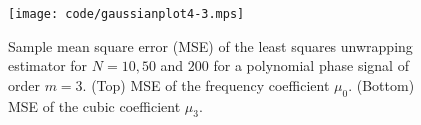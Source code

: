 \documentclass[aap,preprint]{imsart}
\begin{document}
\begin{figure}[p] 
   	\centering 
  		\texttt{[image: code/gaussianplot4-3.mps]}
  		\caption{Sample mean square error (MSE) of the least squares unwrapping estimator for $N=10,50$ and $200$ for a polynomial phase signal of order $m=3$. (Top) MSE of the frequency coefficient $\mu_0$.  (Bottom) MSE of the cubic coefficient $\mu_3$.} 
  		\label{plot:polyest1} 
 \end{figure} 




\end{document}
